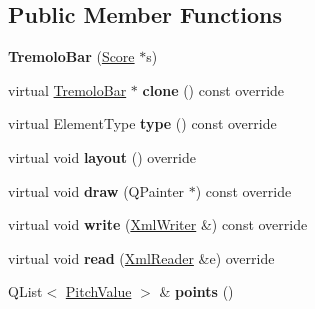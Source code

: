 \subsection*{Public Member Functions}
\begin{DoxyCompactItemize}
\item 
\mbox{\label{class_ms_1_1_tremolo_bar_a72f9736f765ba6d85d2949c7b2ec5d67}} 
{\bfseries Tremolo\+Bar} (\hyperlink{class_ms_1_1_score}{Score} $\ast$s)
\item 
\mbox{\label{class_ms_1_1_tremolo_bar_afedb864a37bf39243e97fa1de09314b9}} 
virtual \hyperlink{class_ms_1_1_tremolo_bar}{Tremolo\+Bar} $\ast$ {\bfseries clone} () const override
\item 
\mbox{\label{class_ms_1_1_tremolo_bar_a4fa9481ad52b88edebc4ce0008d7bfa0}} 
virtual Element\+Type {\bfseries type} () const override
\item 
\mbox{\label{class_ms_1_1_tremolo_bar_a1657815beb154df43d4a6394403bce64}} 
virtual void {\bfseries layout} () override
\item 
\mbox{\label{class_ms_1_1_tremolo_bar_aa2837591581c5f6a574920e90c23b43f}} 
virtual void {\bfseries draw} (Q\+Painter $\ast$) const override
\item 
\mbox{\label{class_ms_1_1_tremolo_bar_a993b95fa752d2e7a1bff06401c29deb2}} 
virtual void {\bfseries write} (\hyperlink{class_ms_1_1_xml_writer}{Xml\+Writer} \&) const override
\item 
\mbox{\label{class_ms_1_1_tremolo_bar_a92e3e5e723321f667278d96abc670ef3}} 
virtual void {\bfseries read} (\hyperlink{class_ms_1_1_xml_reader}{Xml\+Reader} \&e) override
\item 
\mbox{\label{class_ms_1_1_tremolo_bar_a1257fde04910e34591f34660ffc69a76}} 
Q\+List$<$ \hyperlink{struct_ms_1_1_pitch_value}{Pitch\+Value} $>$ \& {\bfseries points} ()
\item 
\mbox{\label{class_ms_1_1_tremolo_bar_a08754fb974a0f29296874b18d14f0f14}} 

\end{DoxyCompactItemize}
